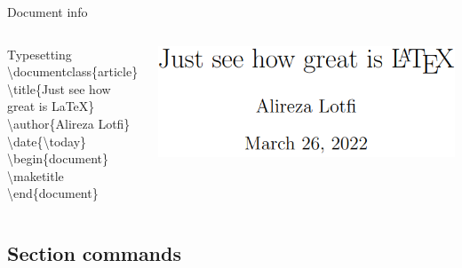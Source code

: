 \documentclass[10pt,xcolor={dvipsnames}]{beamer}
\begin{document}
		\begin{frame}{Document info}
			\onslide<2->
			
			\begin{columns}[T]
				
				\begin{column}{.5 \textwidth}
					
					\begin{block}{Typesetting}
						\textbackslash documentclass\{{\color{blue}article}\}\\
						{\color{orange}\textbackslash title}\{Just see how great is \LaTeX\}\\
						{\color{orange}\textbackslash author}\{Alireza Lotfi\}\\
						{\color{orange}\textbackslash date}\{\textbackslash today\}\\
						
						\textbackslash begin\{{\color{blue}document}\}\\
						\quad \textbackslash maketitle\\
						\textbackslash end\{{\color{blue}document}\}\\
					\end{block}	
				\end{column}
			
				\begin{column}{.5 \textwidth}
					\vspace{1cm}
					\includegraphics[width=1\textwidth]{Images/documentInfo.png}
				\end{column}

			\end{columns}
			
		\end{frame}
	
	\subsection{Section commands}
	
\end{document}
